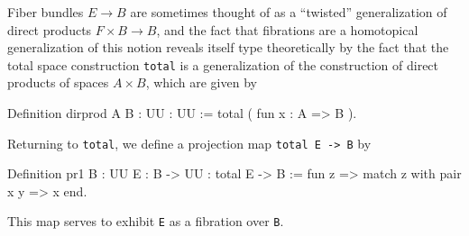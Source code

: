 Fiber bundles $E\to B$ are sometimes thought of as a ``twisted'' generalization
of direct products $F\times B\to B$, and the fact that fibrations are
a homotopical generalization of this notion reveals itself type
theoretically by the fact that the total space
construction \verb|total| is a generalization of the construction
of direct products of spaces $A\times B$, which are given by
\begin{center}
  \begin{coqcode}
Definition dirprod { A B : UU } : UU := 
 total ( fun x : A => B ).
  \end{coqcode}
\end{center}
Returning to \verb|total|, we define a projection map
\verb|total E -> B| by 
\begin{center}
  \begin{coqcode}
Definition pr1 { B : UU } { E : B -> UU } : total E -> B := fun z => match z with pair x y => x end.
  \end{coqcode}
\end{center}
This map serves to exhibit \verb|E| as a fibration over
\verb|B|.
